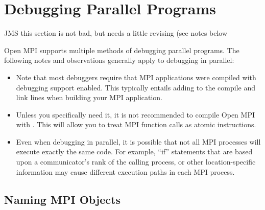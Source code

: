 %
% 
% 
%

\chapter{Debugging Parallel Programs}
\label{sec:debug}
\label{sec:debugging}

{\Huge JMS this section is not bad, but needs a little revising (see
  notes below}

Open MPI supports multiple methods of debugging parallel programs.
The following notes and observations generally apply to debugging in
parallel:

\begin{itemize}
\item Note that most debuggers require that MPI applications were
  compiled with debugging support enabled.  This typically entails
  adding  to the compile and link lines when building
  your MPI application.
  
\item Unless you specifically need it, it is not recommended to
  compile Open MPI with .  This will allow you to treat MPI
  function calls as atomic instructions.
  
\item Even when debugging in parallel, it is possible that not all MPI
  processes will execute exactly the same code.  For example, ``if''
  statements that are based upon a communicator's rank of the calling
  process, or other location-specific information may cause different
  execution paths in each MPI process.
\end{itemize}



\section{Naming MPI Objects}

